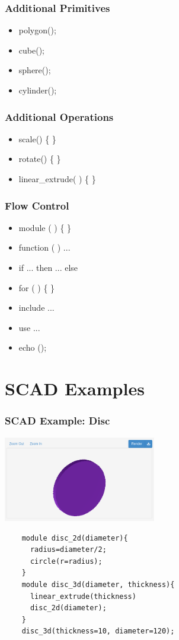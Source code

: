 \documentclass{beamer}
\begin{document}
\begin{frame}
\frametitle{Additional Primitives}
\begin{itemize}
\item polygon();
\item cube();
\item sphere();
\item cylinder();
\end{itemize}
\end{frame}

\begin{frame}
\frametitle{Additional Operations}
\begin{itemize}
\item scale() \{ \}
\item rotate() \{ \}
\item linear\_extrude( ) \{ \}
\end{itemize}
\end{frame}

\begin{frame}
\frametitle{Flow Control}
\begin{itemize}
\item module ( ) \{ \}
\item function ( ) ...
\item if ... then ... else
\item for ( ) \{ \}
\item include ...
\item use ...
\item echo ();
\end{itemize}
\end{frame}

\section{SCAD Examples}
\begin{frame}[fragile]
\frametitle{SCAD Example: Disc}
\includegraphics[width=0.5\textwidth, center]{disc_example.png}
  \lstset{basicstyle=\ttfamily\scriptsize}
    \begin{lstlisting}
    module disc_2d(diameter){
      radius=diameter/2;
      circle(r=radius);
    }
    module disc_3d(diameter, thickness){
      linear_extrude(thickness)
      disc_2d(diameter);
    }
    disc_3d(thickness=10, diameter=120);
    \end{lstlisting}
\end{frame}
\end{document}
